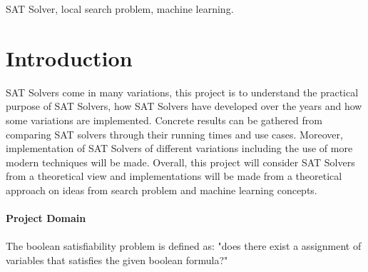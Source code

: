 \documentclass[12pt,a4paper]{article}
\begin{document}
\begin{keywords}
SAT Solver, local search problem, machine learning.
\end{keywords}
\newpage
\section{Introduction}

SAT Solvers come in many variations, this project is to understand the practical purpose of SAT Solvers, how SAT Solvers have developed over the years and how some variations are implemented. Concrete results can be gathered from comparing SAT solvers through their running times and use cases. Moreover, implementation of SAT Solvers of different variations including the use of more modern techniques will be made. Overall, this project will consider SAT Solvers from a theoretical view and implementations will be made from a theoretical approach on ideas from search problem and machine learning concepts.\\\\
{\bf Project Domain}\\\\
The boolean satisfiability problem is defined as: "does there exist a assignment of variables that satisfies the given boolean formula?" \\
\end{document}
